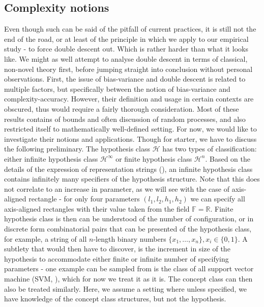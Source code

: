 \subsection{Complexity notions}
Even though such can be said of the pitfall of current practices, it is still not the end of the road, or at least of the principle in which we apply to our empirical study - to force double descent out. Which is rather harder than what it looks like. We might as well attempt to analyse double descent in terms of classical, non-novel theory first, before jumping straight into conclusion without personal observations. First, the issue of bias-variance and double descent is related to multiple factors, but specifically between the notion of bias-variance and complexity-accuracy. However, their definition and usage in certain contexts are obscured, thus would require a fairly thorough consideration. Most of these results contains of bounds and often discussion of random processes, and also restricted itself to mathematically well-defined setting. For now, we would like to investigate their notions and applications. Though for starter, we have to discuss the following preliminary. The hypothesis class $\mathcal{H}$ has two types of classification: either infinite hypothesis class $\mathcal{H}^{\infty}$ or finite hypothesis class $\mathcal{H}^{n}$. Based on the details of the expression of representation strings (\cite{10.5555/200548}), an infinite hypothesis class contains infinitely many specifiers of the hypothesis structure. Note that this does not correlate to an increase in parameter, as we will see with the case of axis-aligned rectangle - for only four parameters $(l_{1},l_{2},h_{1},h_2)$ we can specify all axis-aligned rectangles with their value taken from the field $\mathbb{F}=\mathbb{R}$. Finite hypothesis class is then can be understood of the number of configuration, or in discrete form combinatorial pairs that can be presented of the hypothesis class, for example, a string of all $n$-length binary numbers $\{x_{1},\dots,x_{n}\}, x_{i}\in \{0,1\}$. A subtlety that would then have to discover, is the increment in size of the hypothesis to accommodate either finite or infinite number of specifying parameters - one example can be sampled from is the class of all support vector machine (SVM, \cite{Vapnik1999-VAPTNO}), which for now we treat it as it is. The concept class can then also be treated similarly. Here, we assume a setting where unless specified, we have knowledge of the concept class structures, but not the hypothesis. 

